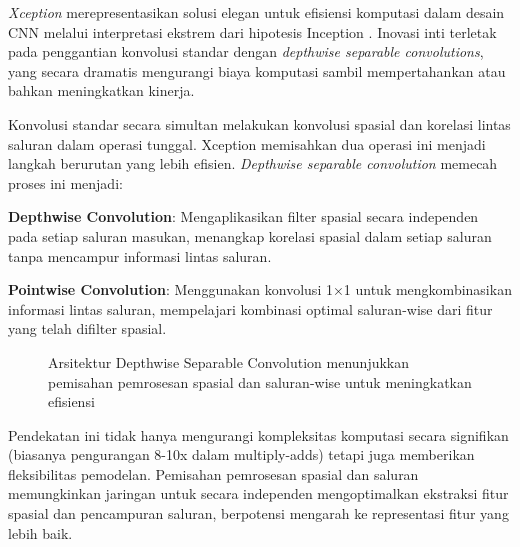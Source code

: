 \textit{Xception} merepresentasikan solusi elegan untuk efisiensi komputasi dalam desain CNN melalui interpretasi ekstrem dari hipotesis Inception \cite{chollet2017xception}. Inovasi inti terletak pada penggantian konvolusi standar dengan \textit{depthwise separable convolutions}, yang secara dramatis mengurangi biaya komputasi sambil mempertahankan atau bahkan meningkatkan kinerja.

Konvolusi standar secara simultan melakukan konvolusi spasial dan korelasi lintas saluran dalam operasi tunggal. Xception memisahkan dua operasi ini menjadi langkah berurutan yang lebih efisien. \textit{Depthwise separable convolution} memecah proses ini menjadi:

\textbf{Depthwise Convolution}: Mengaplikasikan filter spasial secara independen pada setiap saluran masukan, menangkap korelasi spasial dalam setiap saluran tanpa mencampur informasi lintas saluran.

\textbf{Pointwise Convolution}: Menggunakan konvolusi 1×1 untuk mengkombinasikan informasi lintas saluran, mempelajari kombinasi optimal saluran-wise dari fitur yang telah difilter spasial.

\begin{figure}[H]
    \centering
    \caption{Arsitektur Depthwise Separable Convolution menunjukkan pemisahan pemrosesan spasial dan saluran-wise untuk meningkatkan efisiensi}
    \label{fig:xception_block}
\end{figure}

Pendekatan ini tidak hanya mengurangi kompleksitas komputasi secara signifikan (biasanya pengurangan 8-10x dalam multiply-adds) tetapi juga memberikan fleksibilitas pemodelan. Pemisahan pemrosesan spasial dan saluran memungkinkan jaringan untuk secara independen mengoptimalkan ekstraksi fitur spasial dan pencampuran saluran, berpotensi mengarah ke representasi fitur yang lebih baik.

